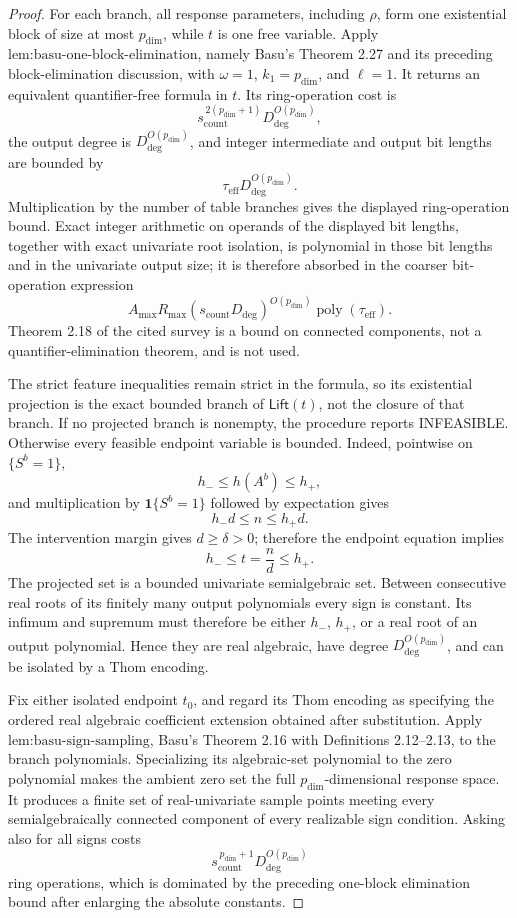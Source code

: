 \documentclass{article}
\begin{document}
\begin{proof}
For each branch, all response parameters, including \(\rho\), form one existential block of size at most \(p_{\mathrm{dim}}\), while \(t\) is one free variable.  Apply \(\text{lem:basu-one-block-elimination}\), namely Basu's Theorem 2.27 and its preceding block-elimination discussion, with \(\omega=1\), \(k_1=p_{\mathrm{dim}}\), and \(\ell=1\).  It returns an equivalent quantifier-free formula in \(t\).  Its ring-operation cost is
\[
s_{\mathrm{count}}^{\,2(p_{\mathrm{dim}}+1)}
D_{\mathrm{deg}}^{O(p_{\mathrm{dim}})},
\]
the output degree is \(D_{\mathrm{deg}}^{O(p_{\mathrm{dim}})}\), and integer intermediate and output bit lengths are bounded by
\[
\tau_{\mathrm{eff}}D_{\mathrm{deg}}^{O(p_{\mathrm{dim}})}.
\]
Multiplication by the number of table branches gives the displayed ring-operation bound.  Exact integer arithmetic on operands of the displayed bit lengths, together with exact univariate root isolation, is polynomial in those bit lengths and in the univariate output size; it is therefore absorbed in the coarser bit-operation expression
\[
A_{\max}R_{\max}
(s_{\mathrm{count}}D_{\mathrm{deg}})^{O(p_{\mathrm{dim}})}
\operatorname{poly}(\tau_{\mathrm{eff}}).
\]
Theorem 2.18 of the cited survey is a bound on connected components, not a quantifier-elimination theorem, and is not used.

The strict feature inequalities remain strict in the formula, so its existential projection is the exact bounded branch of \(\mathsf{Lift}(t)\), not the closure of that branch.  If no projected branch is nonempty, the procedure reports INFEASIBLE.  Otherwise every feasible endpoint variable is bounded.  Indeed, pointwise on \(\{S^b=1\}\),
\[
h_-\leq h(A^b)\leq h_+,
\]
and multiplication by \(\mathbf 1\{S^b=1\}\) followed by expectation gives
\[
h_-d\leq n\leq h_+d.
\]
The intervention margin gives \(d\geq\delta>0\); therefore the endpoint equation implies
\[
h_-\leq t=\frac nd\leq h_+.
\]
The projected set is a bounded univariate semialgebraic set.  Between consecutive real roots of its finitely many output polynomials every sign is constant.  Its infimum and supremum must therefore be either \(h_-\), \(h_+\), or a real root of an output polynomial.  Hence they are real algebraic, have degree \(D_{\mathrm{deg}}^{O(p_{\mathrm{dim}})}\), and can be isolated by a Thom encoding.

Fix either isolated endpoint \(t_0\), and regard its Thom encoding as specifying the ordered real algebraic coefficient extension obtained after substitution.  Apply \(\text{lem:basu-sign-sampling}\), Basu's Theorem 2.16 with Definitions 2.12--2.13, to the branch polynomials.  Specializing its algebraic-set polynomial to the zero polynomial makes the ambient zero set the full \(p_{\mathrm{dim}}\)-dimensional response space.  It produces a finite set of real-univariate sample points meeting every semialgebraically connected component of every realizable sign condition.  Asking also for all signs costs
\[
s_{\mathrm{count}}^{\,p_{\mathrm{dim}}+1}
D_{\mathrm{deg}}^{O(p_{\mathrm{dim}})}
\]
ring operations, which is dominated by the preceding one-block elimination bound after enlarging the absolute constants.


\end{proof}
\end{document}

